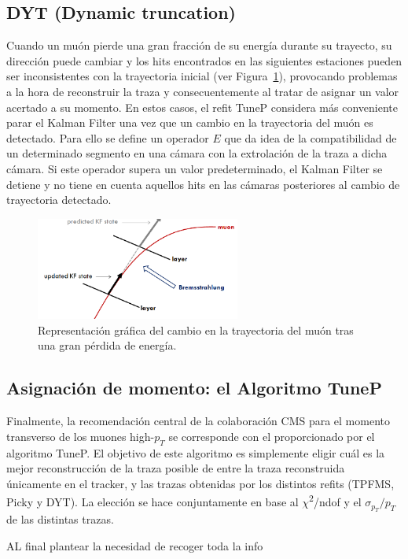 \subsection{DYT (Dynamic truncation)}\label{DYT}

Cuando un mu\'on pierde una gran fracci\'on de su energ\'ia durante su trayecto, su direcci\'on puede cambiar y los hits encontrados en las siguientes estaciones pueden ser inconsistentes con la trayectoria inicial (ver Figura~\ref{fig:energyloss}), provocando problemas a la hora de reconstruir la traza y consecuentemente al tratar de asignar un valor acertado a su momento. En estos casos, el refit TuneP considera m\'as conveniente parar el Kalman Filter una vez que un cambio en la trayectoria del mu\'on es detectado. Para ello se define un operador $E$ que da idea de la compatibilidad de un determinado segmento en una c\'amara con la extrolaci\'on de la traza a dicha c\'amara. Si este operador supera un valor predeterminado, el Kalman Filter se detiene y no tiene en cuenta aquellos hits en las c\'amaras posteriores al cambio de trayectoria detectado. 

\begin{figure}
\centering
\includegraphics[width=0.60\textwidth]{figures/energyloss.png}
\caption{Representaci\'on gr\'afica del cambio en la trayectoria del mu\'on tras una gran p\'erdida de energ\'ia.}
\label{fig:energyloss}        
\end{figure}


\subsection{Asignaci\'on de momento: el Algoritmo TuneP}\label{TuneP}

Finalmente, la recomendaci\'on central de la colaboraci\'on CMS para el momento transverso de los muones high-$p_{T}$ se corresponde con el proporcionado por el algoritmo TuneP. El objetivo de este algoritmo es simplemente eligir cu\'al es la mejor reconstrucci\'on de la traza posible de entre la traza reconstruida \'unicamente en el tracker, y las trazas obtenidas por los distintos refits (TPFMS, Picky y DYT). La elecci\'on se hace conjuntamente en base al $\chi$\textsuperscript{2}/ndof y el $\sigma_{p_{T}}/p_{T}$ de las distintas trazas.


AL final plantear la necesidad de recoger toda la info

